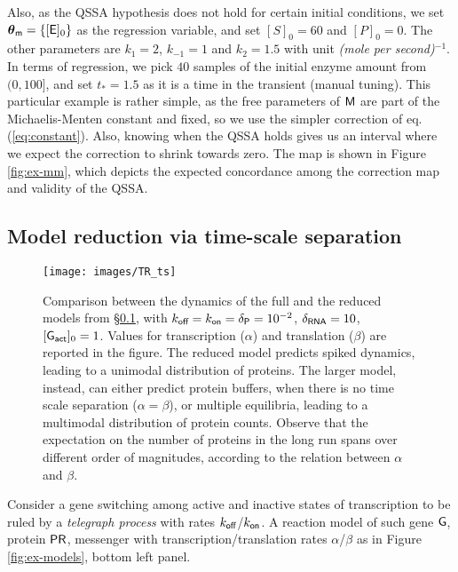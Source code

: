 \documentclass[runningheads,a4paper]{llncs}
\newcommand{\bM}{{\sf{M}}}
\newcommand{\pmpar}{\bth_{\sf{m}}}
\newcommand{\bth}{\boldsymbol{\theta}}
\newcommand{\QSSA}{{\sf QSSA}}
\newcommand{\E}{{\sf{E}}}
\newcommand{\PR}{{{\sf{PR}}}}
\newcommand{\GE}{{\sf{G}}}
\newcommand{\GEA}{{\sf{G}_{\text{\sf act}}}}
\newcommand{\RNA}{{\sf{mRNA}}}
\begin{document}
Also,  as  the \QSSA{} hypothesis  does not hold for certain initial conditions, we set $\pmpar = \{ [\E{}]_0\}$ as the regression variable, and set $[S]_0=60$ and $[P]_0=0$. The other parameters are  $k_1  = 2$, $k_{-1}=1$ and $k_2  = 1.5$  with unit {\em (mole per second)}$^{-1}$. In terms of regression, we pick $40$ samples of the initial enzyme amount from $(0,100]$, and set $t_\ast = 1.5$ as it is a time in the transient (manual tuning). This particular example is rather simple, as the free parameters of $\bM$  are part of the Michaelis-Menten constant and fixed, so we use the simpler correction of eq. (\ref{eq:constant}). Also, knowing when the \QSSA{}  holds  gives us an  interval where we expect the correction to shrink towards zero. The map is shown in Figure \ref{fig:ex-mm}, which depicts the expected concordance among the correction map and validity of the \QSSA{}.
   

\subsection{Model reduction via time-scale separation} \label{sec:examp2}


\begin{figure}[t] \center
\texttt{[image: images/TR\_ts]}
\caption{Comparison between the dynamics of the full and the reduced models from \S \ref{sec:examp2}, with $k_{\text{\sf off}} = k_{\text{\sf on}} =  \delta_{\text{\sf P}} = 10^{-2}$, $\delta_{\text{\sf RNA}} =10$, $[\GEA]_0=1$. Values for transcription ($\alpha$) and translation ($\beta$) are reported in the figure. The reduced model predicts spiked dynamics, leading to a unimodal distribution of proteins. The larger model, instead, can either predict protein buffers, when there is no time scale separation ($\alpha=\beta$), or multiple equilibria, leading to a multimodal   distribution of protein counts. Observe that the expectation on the number of proteins in the long run spans over different order of magnitudes, according to the relation between $\alpha$ and $\beta$.}
\label{fig:ex_PTN}
\end{figure}


Consider a  gene switching among active and inactive states of \RNA{} transcription  to be ruled by a {\em telegraph process} with rates $k_{\text{\sf off}}$/$k_{\text{\sf on}}$. A reaction model of such gene $\GE{}$, protein $\PR{}$, messenger \RNA{} with  transcription/translation  rates $\alpha$/$\beta$ as in Figure \ref{fig:ex-models}, bottom left panel.
\end{document}
